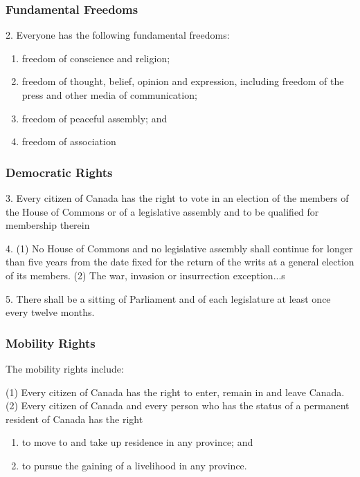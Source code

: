 \begin{frame}
\frametitle{Fundamental Freedoms}

2. Everyone has the following fundamental freedoms:

\begin{enumerate}[a]
	\item freedom of conscience and religion;
	\item freedom of thought, belief, opinion and expression,
		including freedom of the press and other media of
		communication;
	\item freedom of peaceful assembly; and
	\item freedom of association
\end{enumerate}

\end{frame}



\begin{frame}
\frametitle{Democratic Rights}

3. Every citizen of Canada has the right to vote in an election of the members of the House of Commons or of a legislative assembly and to be qualified for membership therein 

4. (1) No House of Commons and no legislative assembly shall continue for longer than five years from the date fixed for the return of the writs at a general election of its members. (2) The war, invasion or insurrection exception...s

5. There shall be a sitting of Parliament and of each legislature at least once every twelve months.

\end{frame}



\begin{frame}
\frametitle{Mobility Rights}

The mobility rights include:

(1) Every citizen of Canada has the right to enter, remain in and leave Canada.\\
(2) Every citizen of Canada and every person who has the status of a permanent resident of Canada has the right
\begin{enumerate}[a]
 \item to move to and take up residence in any province; and
 \item  to pursue the gaining of a livelihood in any province. 
\end{enumerate}

\end{frame}



